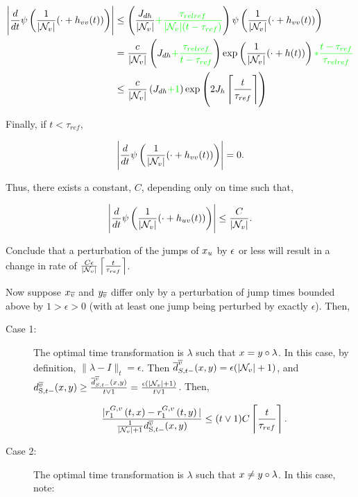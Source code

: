\begin{description}
\begin{description}
\begin{align*}
\left|\frac{d}{dt}\psi\left(\frac{1}{|\mathcal{N}_{v}|} (\cdot + h_{vv}(t))\right)\right| &\leq \left(\frac{J_{dh}}{|\mathcal{N}_{v}|}\textcolor{green}{+\frac{\tau_{relref}}{|\mathcal{N}_{v}|(t-\tau_{ref})}}\right)\psi\left(\frac{1}{|\mathcal{N}_{v}|} (\cdot + h_{vv}(t))\right)\\
&=\frac{c}{|\mathcal{N}_{v}|}\left(J_{dh}\textcolor{green}{+\frac{\tau_{relref}}{t-\tau_{ref}}}\right)\exp\left(\frac{1}{|\mathcal{N}_{v}|}(\cdot + h(t))\right)\textcolor{green}{*\frac{t-\tau_{ref}}{\tau_{relref}}}\\
&\leq \frac{c}{|\mathcal{N}_{v}|}\left(J_{dh}\textcolor{green}{ + 1}\right)\exp\left(2J_h\left\lceil\frac{t}{\tau_{ref}}\right\rceil\right)
\end{align*}

Finally, if \(t < \tau_{ref}\),

\[\left|\frac{d}{dt}\psi\left(\frac{1}{|\mathcal{N}_{v}|} (\cdot + h_{vv}(t))\right)\right| = 0.\]

Thus, there exists a constant, \(C\), depending only on time such that,

\[\left|\frac{d}{dt}\psi\left(\frac{1}{|\mathcal{N}_{v}|} (\cdot + h_{uv}(t))\right)\right| \leq \frac{C}{|\mathcal{N}_{v}|}.\]

Conclude that a perturbation of the jumps of \(x_{u}\) by \(\epsilon\) or less will result in a change in rate of \(\frac{C\epsilon}{|\mathcal{N}_{v}|}\left\lceil\frac{t}{\tau_{ref}}\right\rceil\). 

Now suppose \(x_{\overline{v}}\) and \(y_{\overline{v}}\) differ only by a perturbation of jump times bounded above by \(1 > \epsilon > 0\) (with at least one jump being perturbed by exactly \(\epsilon\)). Then,

\begin{description}
\item[Case 1: ] The optimal time transformation is \(\lambda\) such that \(x = y\circ\lambda\). In this case, by definition, \(\|\lambda - I\|_t = \epsilon\). Then \(\overline{d}^{\overline{v}}_{S,t-}(x,y) = \epsilon(|\mathcal{N}_{v}|+1)\), and \(\stmet{t-}^{\cl{v}}(\xf,\xg) \geq \frac{\ov{d}_{S,t-}^{\cl{v}}(\xf,\xg)}{t\vee 1} = \frac{\ep(|\neigh{v}|+1)}{t\vee 1}\). Then,

\[\frac{|\rate\gvpara{G}{v}\stpara{1}\tmepro{t}{\xf}{} - \rate\gvpara{G}{v}\stpara{1}\tmepro{t}{\xg}{}|}{\frac{1}{|\neigh{v}|+1}\stmet{t-}^{\cl{v}}(\xf,\xg)} \leq (t\vee 1)C\left\lceil\frac{t}{\tau_{ref}}\right\rceil.\]

\item[Case 2: ] The optimal time transformation is \(\lambda\) such that \(x \neq y\circ \lambda\). In this case, note:


\end{description}
\end{description}
\end{description}
